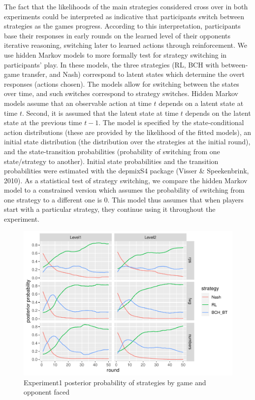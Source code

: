\documentclass[man,floatsintext]{apa6}
\begin{document}
The fact that the likelihoods of the main strategies considered cross over in both experiments could be interpreted as indicative that participants switch between strategies as the games progress. According to this interpretation, participants base their responses in early rounds on the learned level of their opponents iterative reasoning, switching later to learned actions through reinforcement.
We use hidden Markov models to more formally test for strategy switching in participants' play. In these models, the three strategies (RL, BCH with between-game transfer, and Nash) correspond to latent states which determine the overt responses (actions chosen). The models allow for switching between the states over time, and such switches correspond to strategy switches. Hidden Markov models assume that an observable action at time \(t\) depends on a latent state at time \(t\). Second, it is assumed that the latent state at time \(t\) depends on the latent state at the previous time \(t-1\). The model is specified by the state-conditional action distributions (these are provided by the likelihood of the fitted models), an initial state distribution (the distribution over the strategies at the initial round), and the state-transition probabilities (probability of switching from one state/strategy to another). Initial state probabilities and the transition probabilities were estimated with the depmixS4 package (Visser \& Speekenbrink, 2010). As a statistical test of strategy switching, we compare the hidden Markov model to a constrained version which assumes the probability of switching from one strategy to a different one is 0. This model thus assumes that when players start with a particular strategy, they continue using it throughout the experiment.

\begin{figure}

{\centering \includegraphics{paper_draft_2021_files/figure-latex/exp1-posteriors-plot-1} 

}

\caption{Experiment1 posterior probability of strategies by game and opponent faced}\label{fig:exp1-posteriors-plot}
\end{figure}
\end{document}
